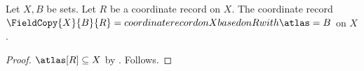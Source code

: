 

\begin{construction}\label{unproved_field_copy}
    Let $X,B$ be sets.
    Let $R$ be a coordinate record on $X$.
    The coordinate record $\FieldCopy{X}{B}{R}=
        coordinate record on X based on R with \atlas=B$ on $X$.
\end{construction}
\begin{proof}
    $\atlas[R]\subseteq X$ by .
    Follows.
\end{proof}
